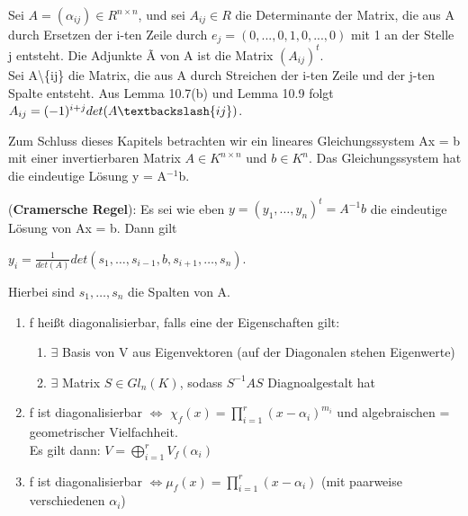 \begin{definition}
Sei $A = (\alpha_{ij}) \in R^{n \times n}$, und sei $A_{ij} \in R$ die Determinante der Matrix, die aus A durch Ersetzen der i-ten Zeile durch $e_j = (0,...,0,1,0,...,0)$ mit 1 an der Stelle j entsteht. Die Adjunkte \~{A} von A ist die Matrix $(A_{ij})^t$.\\
Sei A\textbackslash\{ij\} die Matrix, die aus A durch Streichen der i-ten Zeile und der j-ten Spalte entsteht. Aus Lemma 10.7(b) und Lemma 10.9 folgt $A_{ij} =(-1)^{i+j} det(A\textbackslash\{ij\})$.
\end{definition}

Zum Schluss dieses Kapitels betrachten wir ein lineares Gleichungssystem Ax = b mit einer invertierbaren Matrix $A \in K^{n \times n}$ und $b \in K^n$. Das Gleichungssystem hat die eindeutige Lösung y = A$^{-1}$b.

\begin{theorem}
(\textbf{Cramersche Regel}): Es sei wie eben $y = (y_1, …, y_n)^t = A^{-1}b$ die eindeutige Lösung von Ax = b. Dann gilt
\begin{center}
$y_i = \frac{1}{det(A)} det(s_1, …, s_{i-1}, b, s_{i+1}, …, s_n)$.
\end{center}
Hierbei sind $s_1, …, s_n$ die Spalten von A.
\end{theorem}


\begin{theorem}
\leavevmode
\begin{enumerate}
	\item f heißt diagonalisierbar, falls eine der Eigenschaften gilt:
	\begin{enumerate}
		\item $\exists$ Basis von V aus Eigenvektoren (auf der Diagonalen stehen Eigenwerte)
		\item $\exists$ Matrix $S \in Gl_n(K)$, sodass $S^{-1}AS$ Diagnoalgestalt hat
	\end{enumerate}
	\item f ist diagonalisierbar $\Leftrightarrow$ $\chi_f(x) = \prod \limits_{i=1}^{r} (x- \alpha_i)^{m_i}$ und algebraischen = geometrischer Vielfachheit.\\Es gilt dann: $V=\bigoplus \limits_{i=1}^r V_f(\alpha_i)$
	\item f ist diagonalisierbar $\Leftrightarrow \mu_f(x) = \prod \limits_{i=1}^{r}(x-\alpha_i)$ (mit paarweise verschiedenen $\alpha_i$) 
\end{enumerate}
\end{theorem}

